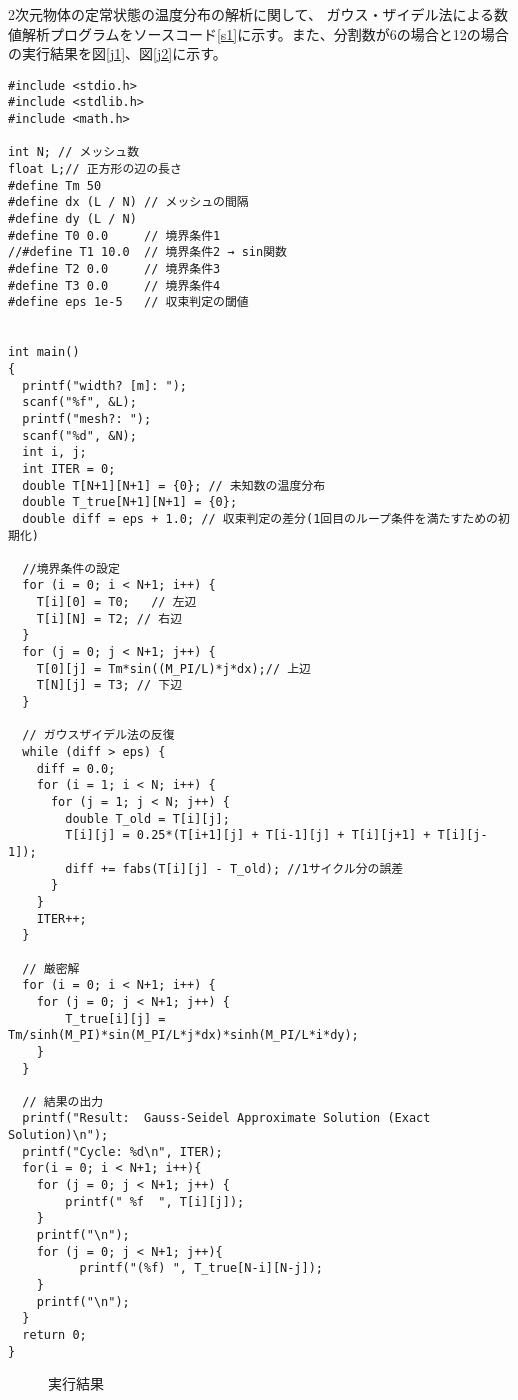 2次元物体の定常状態の温度分布の解析に関して、
ガウス・ザイデル法による数値解析プログラムをソースコード\ref{s1}に示す。また、分割数が6の場合と12の場合の実行結果を図\ref{j1}、図\ref{j2}に示す。
\begin{lstlisting}[caption=ガウス・ザイデル法による数値解析プログラム,label=s1]
#include <stdio.h>
#include <stdlib.h>
#include <math.h>
  
int N; // メッシュ数
float L;// 正方形の辺の長さ
#define Tm 50
#define dx (L / N) // メッシュの間隔
#define dy (L / N)
#define T0 0.0     // 境界条件1
//#define T1 10.0  // 境界条件2 → sin関数
#define T2 0.0     // 境界条件3
#define T3 0.0     // 境界条件4
#define eps 1e-5   // 収束判定の閾値
  
  
int main()
{
  printf("width? [m]: ");
  scanf("%f", &L);
  printf("mesh?: ");
  scanf("%d", &N);
  int i, j;
  int ITER = 0;
  double T[N+1][N+1] = {0}; // 未知数の温度分布
  double T_true[N+1][N+1] = {0}; 
  double diff = eps + 1.0; // 収束判定の差分(1回目のループ条件を満たすための初期化)

  //境界条件の設定
  for (i = 0; i < N+1; i++) {
    T[i][0] = T0;   // 左辺
    T[i][N] = T2; // 右辺
  }
  for (j = 0; j < N+1; j++) {
    T[0][j] = Tm*sin((M_PI/L)*j*dx);// 上辺
    T[N][j] = T3; // 下辺
  }

  // ガウスザイデル法の反復
  while (diff > eps) {
    diff = 0.0;
    for (i = 1; i < N; i++) {
      for (j = 1; j < N; j++) {
        double T_old = T[i][j];
        T[i][j] = 0.25*(T[i+1][j] + T[i-1][j] + T[i][j+1] + T[i][j-1]);
        diff += fabs(T[i][j] - T_old); //1サイクル分の誤差
      }
    }
    ITER++;
  }
 
  // 厳密解
  for (i = 0; i < N+1; i++) {
    for (j = 0; j < N+1; j++) {
        T_true[i][j] = Tm/sinh(M_PI)*sin(M_PI/L*j*dx)*sinh(M_PI/L*i*dy);
    }
  }
 
  // 結果の出力
  printf("Result:  Gauss-Seidel Approximate Solution (Exact Solution)\n");
  printf("Cycle: %d\n", ITER);
  for(i = 0; i < N+1; i++){
    for (j = 0; j < N+1; j++) {
        printf(" %f  ", T[i][j]);
    }
    printf("\n");
    for (j = 0; j < N+1; j++){
          printf("(%f) ", T_true[N-i][N-j]);
    }
    printf("\n");
  }
  return 0;
}
\end{lstlisting}

\begin{figure}[H]
  \begin{center}
  \caption{実行結果}
  \label{im1}
  \end{center}
\end{figure}